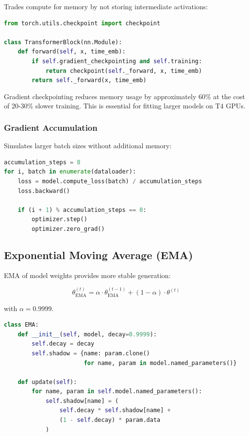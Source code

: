 \documentclass[11pt,a4paper]{article}
\begin{document}
Trades compute for memory by not storing intermediate activations:

\begin{lstlisting}[language=Python]
from torch.utils.checkpoint import checkpoint

class TransformerBlock(nn.Module):
    def forward(self, x, time_emb):
        if self.gradient_checkpointing and self.training:
            return checkpoint(self._forward, x, time_emb)
        return self._forward(x, time_emb)
\end{lstlisting}

\begin{implementation}
Gradient checkpointing reduces memory usage by approximately 60\% at the cost of 20-30\% slower training. This is essential for fitting larger models on T4 GPUs.
\end{implementation}

\subsubsection{Gradient Accumulation}

Simulates larger batch sizes without additional memory:

\begin{lstlisting}[language=Python]
accumulation_steps = 8
for i, batch in enumerate(dataloader):
    loss = model.compute_loss(batch) / accumulation_steps
    loss.backward()
    
    if (i + 1) % accumulation_steps == 0:
        optimizer.step()
        optimizer.zero_grad()
\end{lstlisting}

\subsection{Exponential Moving Average (EMA)}

EMA of model weights provides more stable generation:

\begin{equation}
    \theta_{\text{EMA}}^{(t)} = \alpha \cdot \theta_{\text{EMA}}^{(t-1)} + (1-\alpha) \cdot \theta^{(t)}
\end{equation}

with $\alpha = 0.9999$.

\begin{lstlisting}[language=Python]
class EMA:
    def __init__(self, model, decay=0.9999):
        self.decay = decay
        self.shadow = {name: param.clone() 
                       for name, param in model.named_parameters()}
    
    def update(self):
        for name, param in self.model.named_parameters():
            self.shadow[name] = (
                self.decay * self.shadow[name] + 
                (1 - self.decay) * param.data
            )
\end{lstlisting}
\end{document}
